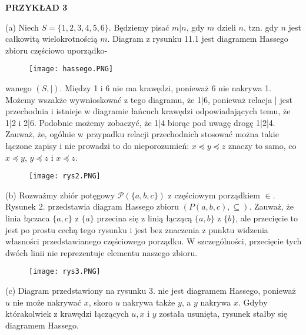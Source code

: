 \documentclass[14pt]{extarticle}
\begin{document}
\textbf{PRZYKŁAD 3} 
\begin{changemargin}{160pt}{0pt} 
\qquad (a) Niech $\mathit{S} = \{1,2,3,4,5,6\}$. Będziemy pisać $\mathit{m}|\mathit{n}$, gdy $\mathit{m}$ dzieli $\mathit{n}$, tzn. gdy $\mathit{n}$ jest całkowitą wielokrotnością $\mathit{m}$. Diagram z rysunku 11.1 jest diagramem Hassego zbioru częściowo uporządko-

\begin{figure}[h!]
\centering
\texttt{[image: hassego.PNG]}
\caption{}
\label{fig:universe}
\end{figure}

wanego $(\mathit{S},|)$. Między 1 i 6 nie ma krawędzi, ponieważ 6 nie nakrywa 1. Możemy wszakże wywnioskować z tego diagramu, że 1|6, ponieważ relacja | jest przechodnia i istnieje w diagramie łańcuch krawędzi odpowiadających temu, że 1|2 i 2|6. Podobnie możemy zobaczyć, że 1|4 biorąc pod uwagę drogę 1|2|4. Zauważ, że, ogólnie w przypadku relacji przechodnich stosować można takie łączone zapisy i nie prowadzi to do nieporozumień: $\mathit{x} \preceq \mathit{y} \preceq \mathit{z}$ znaczy to samo, co $\mathit{x} \preceq \mathit{y}$, $\mathit{y} \preceq \mathit{z}$ i $\mathit{x} \preceq \mathit{z}$.

\begin{figure}[h!]
\centering
\texttt{[image: rys2.PNG]}
\caption{}
\label{fig:universe}
\end{figure}

\qquad (b) Rozważmy zbiór potęgowy $\mathcal{P}(\{\mathit{a},\mathit{b}, \mathit{c}\})$ z częściowym porządkiem $\in$. Rysunek 2. przedstawia diagram Hassego zbioru $(P({a,b,c}),\subseteq)$. Zauważ, że linia łączaca $\{\mathit{a},\mathit{c}\}$ z $\{\mathit{a}\}$ przecina się z linią łączącą $\{\mathit{a},\mathit{b}\}$ z $\{\mathit{b}\}$, ale przecięcie to jest po prostu cechą tego rysunku i jest bez znaczenia z punktu widzenia własności przedstawianego częściowego porządku. W szczególności, przecięcie tych dwóch linii nie reprezentuje elementu naszego zbioru.

\begin{figure}[h!]
\centering
\texttt{[image: rys3.PNG]}
\caption{}
\label{fig:universe}
\end{figure}

\qquad (c) Diagram przedstawiony na rysunku 3. nie jest diagramem Hassego, ponieważ $\mathit{u}$ nie może nakrywać $\mathit{x}$, skoro $\mathit{u}$ nakrywa także $\mathit{y}$, a $\mathit{y}$ nakrywa $\mathit{x}$. Gdyby którakolwiek z krawędzi łączących $\mathit{u}, \mathit{x}$ i $\mathit{y}$ została usunięta, rysunek stałby się diagramem Hassego.


\end{changemargin}
\end{document}
